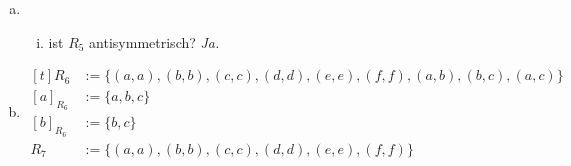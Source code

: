 \begin{enumerate}[(a)]
    \item
        \begin{enumerate}[i)]
            \item ist $R_5$ antisymmetrisch? \textit{Ja.}
        \end{enumerate}
    \item
        $\begin{aligned}[t]
            R_6 &:= \{(a, a), (b, b), (c, c), (d, d), (e, e), (f, f), (a, b), (b, c), (a, c)\} \\
            [a]_{R_6} &:= \{a, b, c\} \\
            [b]_{R_6} &:= \{b, c\} \\
            R_7 &:= \{(a, a), (b, b), (c, c), (d, d), (e, e), (f, f)\}
        \end{aligned}$
\end{enumerate}
